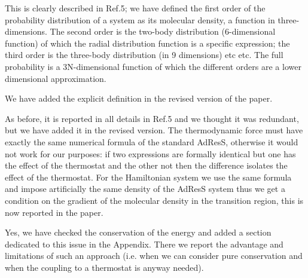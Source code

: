 \documentclass[12pt]{article}
\begin{document}
{\color{blue}{\it (4) Page 4. ``...reproduce the first order of the
    probability...'' and ``Higher orders...'' Could the authors
    specify what (small) quantity the order is referred to?, I think
    it could be orders in the density of solute molecules, or maybe in
    density variation with respect the average. Please be more clear
    when referring to ``orders'' elsewhere in the manuscript.}}

This is clearly described in Ref.5; we have defined the first order of
the probability distribution of a system as its molecular density, a
function in three-dimensions. The second order is the two-body
distribution (6-dimensional function) of which the radial distribution
function is a specific expression; the third order is the three-body
distribution (in 9 dimensions) etc etc. The full probability is a
3N-dimensional function of which the different orders are a lower
dimensional approximation.

We have added the explicit definition in the revised version of the paper.

{\color{blue}{\it (5) Page 5. Auxiliary Hamiltonian. For the sake of
    clarity, the authors should write down this Hamiltonian they refer
    to, with full index details. Also, please write down the form of
    thermodynamic force in the auxiliary Hamiltonian. They mention
    that simulations using the auxiliary Hamiltonian were made with no
    thermostat. Did the authors check that the ``energy'' of this
    Hamiltonian is conserved? Please comment on this important
    issue.}}

As before, it is reported in all details in Ref.5 and we thought it
was redundant, but we have added it in the revised version. The
thermodynamic force must have exactly the same numerical formula of
the standard AdResS, otherwise it would not work for our purposes: if
two expressions are formally identical but one has the effect of the
thermostat and the other not then the difference isolates the effect
of the thermostat. For the Hamiltonian system we use the same formula
and impose artificially the same density of the AdResS system thus we
get a condition on the gradient of the molecular density in the
transition region, this is now reported in the paper.

Yes, we have checked the conservation of the energy and added a
section dedicated to this issue in the Appendix. There we report the
advantage and limitations of such an approach (i.e. when we can
consider pure conservation and when the coupling to a thermostat is
anyway needed).
\end{document}
